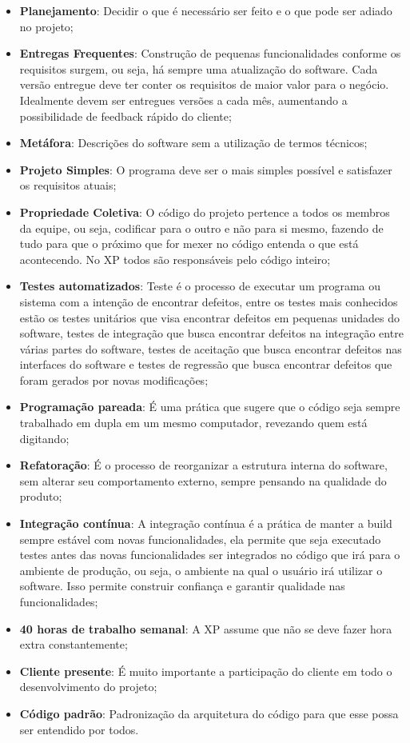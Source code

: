 \begin{itemize}
  \item \textbf{Planejamento}: Decidir o que é necessário ser feito e o que pode ser adiado no projeto;
  \item \textbf{Entregas Frequentes}: Construção de pequenas funcionalidades conforme os requisitos surgem, ou seja, há sempre uma atualização do software. Cada versão entregue deve ter conter os requisitos de maior valor para o negócio. Idealmente devem ser entregues versões a cada mês, aumentando a possibilidade de feedback rápido do cliente;
  \item \textbf{Metáfora}: Descrições do software sem a utilização de termos técnicos;
  \item \textbf{Projeto Simples}: O programa deve ser o mais simples possível e satisfazer os requisitos atuais;
  \item \textbf{Propriedade Coletiva}: O código do projeto pertence a todos os membros da equipe, ou seja, codificar para o outro e não para si mesmo, fazendo de tudo para que o próximo que for mexer no código entenda o que está acontecendo. No XP todos são responsáveis pelo código inteiro;
  \item \textbf{Testes automatizados}: Teste é o processo de executar um programa ou sistema com a intenção de encontrar defeitos, entre os testes mais conhecidos estão os testes unitários que visa encontrar defeitos em pequenas unidades do software, testes de integração que busca encontrar defeitos na integração entre várias partes do software, testes de aceitação que busca encontrar defeitos nas interfaces do software e testes de regressão que busca encontrar defeitos que foram gerados por novas modificações;
  \item \textbf{Programação pareada}: É uma prática que sugere que o código seja sempre trabalhado em dupla em um mesmo computador, revezando quem está digitando;
  \item \textbf{Refatoração}: É o processo de reorganizar a estrutura interna do software, sem alterar seu comportamento externo, sempre pensando na qualidade do produto;
  \item \textbf{Integração contínua}: A integração contínua é a prática de manter a build sempre estável com novas funcionalidades, ela permite que seja executado testes antes das novas funcionalidades ser integrados no código que irá para o ambiente de produção, ou seja, o ambiente na qual o usuário irá utilizar o software. Isso permite construir confiança e garantir qualidade nas funcionalidades;
  \item \textbf{40 horas de trabalho semanal}:  A XP assume que não se deve fazer hora extra constantemente;
  \item \textbf{Cliente presente}: É muito importante a participação do cliente em todo o desenvolvimento do projeto;
  \item \textbf{Código padrão}: Padronização da arquitetura do código para que esse possa ser entendido por todos.
\end{itemize}

